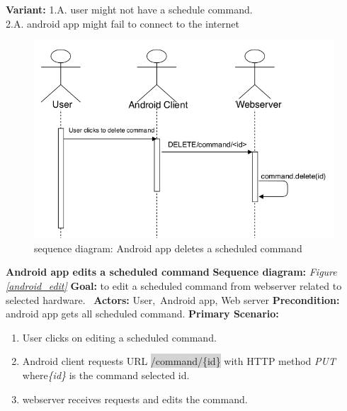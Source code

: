 \documentclass[12pt, oneside, a4paper]{book}
\newcommand{\code}[1]{{\color{red}\colorbox{lightgray}{#1}}}
\newcommand\boldcolor[1]{\textcolor{bold}{\textbf{#1}}}
\begin{document}
				\textbf{Variant:}\newline
				\hspace*{5mm}1.A. user might not have a schedule command. \\
				\hspace*{5mm}2.A. android app might fail to connect to the internet \\
				\begin{figure}[H]
					\includegraphics[width=\linewidth]{img/sequence_android_delete.png}
					\caption{sequence diagram: Android app deletes a scheduled command}
					\label{android_del}
				\end{figure}
				\newpage\hspace*{-6mm}\boldcolor{Android app edits a scheduled command}
				\newline\textbf{Sequence diagram:} \textit{Figure \ref{android_edit}}
				\newline\textbf{Goal:} to edit a scheduled command from webserver related to selected hardware. 
				\newline\textbf{Actors:} User, Android app, Web server
				\newline\textbf{Precondition:} android app gets all scheduled command.
				\newline\textbf{Primary Scenario:}	
				\begin{enumerate}[label*=\arabic*.]
					\item User clicks on editing a scheduled command.
					\item Android client requests URL \code{/command/\{id\}} with HTTP method \textit{PUT} where\textit{\{id\}} is the command selected id. 
					\item  webserver receives requests and edits the command.
				\end{enumerate}
\end{document}
